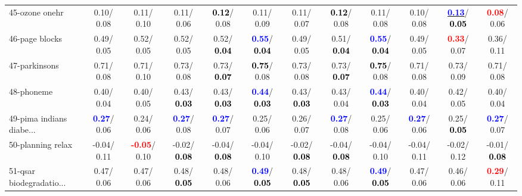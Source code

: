 \begin{table}[h]
\begin{center}
{\begin{tabular}{lc|c|c|c|c|c|c|c|c|c|c}
45-ozone onehr &   0.10/  0.08 &   0.11/  0.10 &   0.11/  0.06 & \textcolor{black}{\textbf{  0.12}}/  0.08 &   0.11/  0.09 &   0.11/  0.07 & \textcolor{black}{\textbf{  0.12}}/  0.08 &   0.11/  0.08 &   0.10/  0.08 & \underline{\textcolor{blue}{\textbf{  0.13}}}/\textcolor{black}{\textbf{  0.05}} & \textcolor{red}{\textbf{  0.08}}/  0.06 \\
46-page blocks &   0.49/  0.05 &   0.52/  0.05 &   0.52/  0.05 &   0.52/\textcolor{black}{\textbf{  0.04}} & \textcolor{blue}{\textbf{  0.55}}/\textcolor{black}{\textbf{  0.04}} &   0.49/  0.05 &   0.51/\textcolor{black}{\textbf{  0.04}} & \textcolor{blue}{\textbf{  0.55}}/\textcolor{black}{\textbf{  0.04}} &   0.49/  0.05 & \textcolor{red}{\textbf{  0.33}}/  0.07 &   0.36/  0.11 \\ \hline
47-parkinsons &   0.71/  0.08 &   0.71/  0.10 &   0.73/  0.08 &   0.73/\textcolor{black}{\textbf{  0.07}} & \textcolor{black}{\textbf{  0.75}}/  0.08 &   0.73/  0.08 &   0.73/\textcolor{black}{\textbf{  0.07}} & \textcolor{black}{\textbf{  0.75}}/  0.08 &   0.71/  0.08 &   0.73/  0.09 &   0.71/  0.08 \\
48-phoneme &   0.40/  0.04 &   0.40/  0.05 &   0.43/\textcolor{black}{\textbf{  0.03}} &   0.43/\textcolor{black}{\textbf{  0.03}} & \textcolor{blue}{\textbf{  0.44}}/\textcolor{black}{\textbf{  0.03}} &   0.43/\textcolor{black}{\textbf{  0.03}} &   0.43/  0.04 & \textcolor{blue}{\textbf{  0.44}}/\textcolor{black}{\textbf{  0.03}} &   0.40/  0.04 &   0.42/  0.05 &   0.40/  0.04 \\
49-pima indians diabe... & \textcolor{blue}{\textbf{  0.27}}/  0.06 &   0.24/  0.06 & \textcolor{blue}{\textbf{  0.27}}/  0.08 & \textcolor{blue}{\textbf{  0.27}}/  0.07 &   0.25/  0.06 &   0.26/  0.07 & \textcolor{blue}{\textbf{  0.27}}/  0.08 &   0.25/  0.06 & \textcolor{blue}{\textbf{  0.27}}/  0.06 &   0.25/\textcolor{black}{\textbf{  0.05}} & \textcolor{blue}{\textbf{  0.27}}/  0.07 \\
50-planning relax &  -0.04/  0.11 & \textcolor{red}{\textbf{ -0.05}}/  0.10 &  -0.02/\textcolor{black}{\textbf{  0.08}} &  -0.04/\textcolor{black}{\textbf{  0.08}} &  -0.04/  0.10 &  -0.02/\textcolor{black}{\textbf{  0.08}} &  -0.04/\textcolor{black}{\textbf{  0.08}} &  -0.04/  0.10 &  -0.04/  0.11 &  -0.02/  0.12 &  -0.01/\textcolor{black}{\textbf{  0.08}} \\
51-qsar biodegradatio... &   0.47/  0.06 &   0.47/  0.06 &   0.48/\textcolor{black}{\textbf{  0.05}} &   0.48/  0.06 & \textcolor{blue}{\textbf{  0.49}}/\textcolor{black}{\textbf{  0.05}} &   0.48/\textcolor{black}{\textbf{  0.05}} &   0.48/  0.06 & \textcolor{blue}{\textbf{  0.49}}/\textcolor{black}{\textbf{  0.05}} &   0.47/  0.06 &   0.46/  0.06 & \textcolor{red}{\textbf{  0.29}}/  0.11 \\

\end{tabular}}
\end{center}
\end{table}
